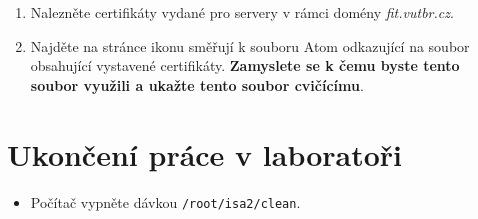 \documentclass[a4paper,11pt]{article}
\begin{document}
\begin{enumerate}
\begin{enumerate}
      \item Nalezněte certifikáty vydané pro servery v rámci domény
        \emph{fit.vutbr.cz}.

      \item Najděte na stránce ikonu směřují k souboru Atom odkazující na soubor
        obsahující vystavené certifikáty. {\bf Zamyslete se k čemu byste tento soubor
        využili a ukažte tento soubor cvičícímu}.

    \end{enumerate}

\end{enumerate}


\section{Ukončení práce v laboratoři}
\begin{itemize}
  \item Počítač vypněte dávkou {\tt /root/isa2/clean}.
\end{itemize}
\end{document}
